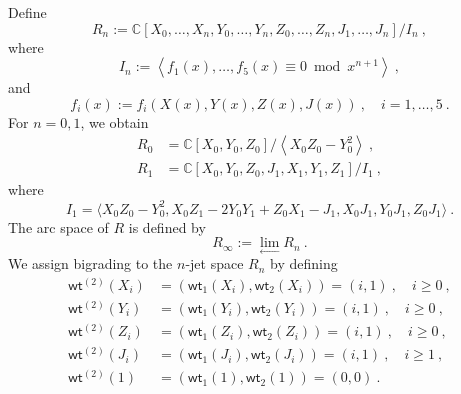 \documentclass[a4paper,10pt]{article}
\newcommand{\C}{\mathds{C}}
\begin{document}
Define 
\begin{equation}
    R_n:=\C[X_0,\dots,X_n,Y_0,\dots,Y_n,Z_0,\dots,Z_n,J_1,\dots,J_n]/I_n~,
\end{equation}
where 
\begin{equation}
    I_n:=\left\langle f_1(x),\dots,f_5(x)\equiv 0 \bmod x^{n+1}\right\rangle~,
\end{equation}
and
\begin{equation}
    f_i(x):=f_i(X(x),Y(x),Z(x),J(x))~,\quad i=1,\dots,5~.
\end{equation}
For $n=0,1$, we obtain
\begin{equation}
\begin{aligned}
R_0 & =\mathds{C}\left[X_0, Y_0, Z_0\right] /\left\langle X_0 Z_0-Y_0^2\right\rangle~, \\
R_1 & =\mathds{C}\left[X_0, Y_0, Z_0, J_1, X_1, Y_1, Z_1\right] / I_1~,
\end{aligned}
\end{equation}
where 
\begin{equation}
    I_1 = \langle X_0 Z_0 - Y_0^2, X_0 Z_1-2 Y_0 Y_1+Z_0 X_1-J_1, X_0 J_1,Y_0 J_1,Z_0J_1 \rangle~.
\end{equation}
The arc space of $R$ is defined by
\begin{equation}
    R_{\infty}:=\lim _{ \leftarrow } R_n~.
\end{equation}
We assign bigrading to the $n$-jet space $R_n$ by defining
\begin{equation}
\begin{split}
\mathsf{wt}^{(2)}\left(X_i\right)&=\left(\mathsf{wt}_1\left(X_i\right),\mathsf{wt}_2\left(X_i\right)\right)=(i, 1)~,\quad i\geq 0~, 
\\
\mathsf{wt}^{(2)}\left(Y_i\right)&=\left(\mathsf{wt}_1\left(Y_i\right),\mathsf{wt}_2\left(Y_i\right)\right)=(i, 1)~,\quad i\geq 0~, 
\\
\mathsf{wt}^{(2)}\left(Z_i\right)&=\left(\mathsf{wt}_1\left(Z_i\right),\mathsf{wt}_2\left(Z_i\right)\right)=(i, 1)~,\quad i\geq 0~, 
\\
\mathsf{wt}^{(2)}\left(J_i\right)&=\left(\mathsf{wt}_1\left(J_i\right),\mathsf{wt}_2\left(J_i\right)\right)=(i, 1)~,\quad i\geq 1~, 
\\
\mathsf{wt}^{(2)}\left(1\right)&=\left(\mathsf{wt}_1\left(1\right),\mathsf{wt}_2\left(1\right)\right)=(0, 0)~.
\end{split}
\end{equation}
\end{document}
